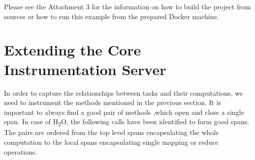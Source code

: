 Please see the Attachment 3 for the information on how to build the project from sources or how to run this example from the prepared Docker machine. 

\section{Extending the Core Instrumentation Server}
In order to capture the relationships between tasks and their computations, we need to instrument the methods mentioned in the previous section. It is important to always find a good pair of methods ,which open and close a single span. In case of H\textsubscript{2}O, the following calls have been identified to form good spans. The pairs are ordered from the top level spans encapsulating the whole computation to the local spans encapsulating single mapping or reduce operations.

